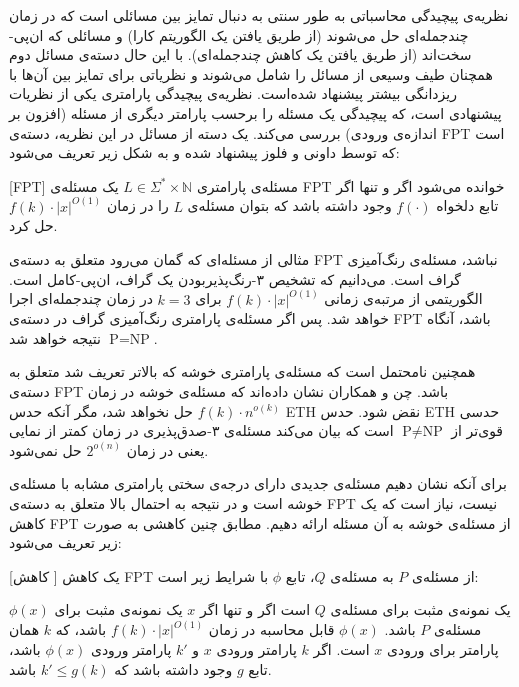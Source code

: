 
نظریه‌ی پیچیدگی محاسباتی به طور سنتی به دنبال تمایز بین مسائلی است که در زمان چندجمله‌ای حل می‌شوند (از طریق یافتن یک الگوریتم کارا) و مسائلی که ان‌پی-سخت‌اند (از طریق یافتن یک کاهش چندجمله‌ای). با این حال دسته‌ی مسائل دوم همچنان طیف وسیعی از مسائل را شامل می‌شوند و نظریاتی برای تمایز بین آن‌ها با ریزدانگی بیشتر پیشنهاد شده‌است. نظریه‌ی پیچیدگی پارامتری یکی از نظریات پیشنهادی است، که پیچیدگی یک مسئله را برحسب پارامتر دیگری از مسئله (افزون بر اندازه‌ی ورودی) بررسی می‌کند. یک دسته از مسائل در این نظریه، دسته‌ی FPT است که توسط داونی و فلوز  پیشنهاد شده و به شکل زیر تعریف می‌شود:

[FPT] مسئله‌ی پارامتری $L \in \Sigma^* \times \mathbb{N}$ یک مسئله‌ی FPT خوانده می‌شود اگر و تنها اگر تابع دلخواه $f(\cdot)$ وجود داشته باشد که بتوان مسئله‌ی $L$ را در زمان
$f(k) \cdot {|x|}^{O(1)}$
حل کرد.

مثالی از مسئله‌ای که گمان می‌رود متعلق به دسته‌ی FPT نباشد، مسئله‌ی رنگ‌آمیزی گراف است. می‌دانیم که تشخیص ۳-رنگ‌پذیربودن یک گراف، ان‌پی-کامل است. الگوریتمی از مرتبه‌ی زمانی
$f(k) \cdot {|x|}^{O(1)}$
برای $k=3$ در زمان چندجمله‌ای اجرا خواهد شد. پس اگر مسئله‌ی پارامتری رنگ‌آمیزی گراف در دسته‌ی FPT باشد، آنگاه
$\text{P}=\text{NP}$
نتیجه خواهد شد.

همچنین نامحتمل است که مسئله‌ی پارامتری خوشه که بالاتر تعریف شد متعلق به دسته‌ی FPT باشد. چن و همکاران  نشان داده‌اند که مسئله‌ی خوشه در زمان
$f(k) \cdot n^{o(k)}$
حل نخواهد شد، مگر آنکه حدس ETH نقض شود. حدس ETH حدسی قوی‌تر از
$\text{P} \neq \text{NP}$
است که بیان می‌کند مسئله‌ی ۳-صدق‌پذیری در زمان کمتر از نمایی یعنی در زمان $2^{o(n)}$ حل نمی‌شود.

برای آنکه نشان دهیم مسئله‌ی جدیدی دارای درجه‌ی سختی پارامتری مشابه با مسئله‌ی خوشه است و در نتیجه به احتمال بالا متعلق به دسته‌ی FPT نیست، نیاز است که یک کاهش FPT از مسئله‌ی خوشه به آن مسئله ارائه دهیم. مطابق  چنین کاهشی به صورت زیر تعریف می‌شود:

[کاهش ]
یک کاهش FPT از مسئله‌ی $P$ به مسئله‌ی $Q$، تابع $\phi$ با شرایط زیر است:

 $\phi(x)$ یک نمونه‌ی مثبت برای مسئله‌ی $Q$ است اگر و تنها اگر $x$ یک نمونه‌ی مثبت برای مسئله‌ی $P$ باشد.
 $\phi(x)$ قابل محاسبه در زمان
$f(k) \cdot {|x|}^{O(1)}$
باشد، که $k$ همان پارامتر برای ورودی $x$ است.
 اگر $k$ پارامتر ورودی $x$ و $k'$ پارامتر ورودی $\phi(x)$ باشد، تابع $g$ وجود داشته باشد که $k' \leq g(k)$ باشد.

